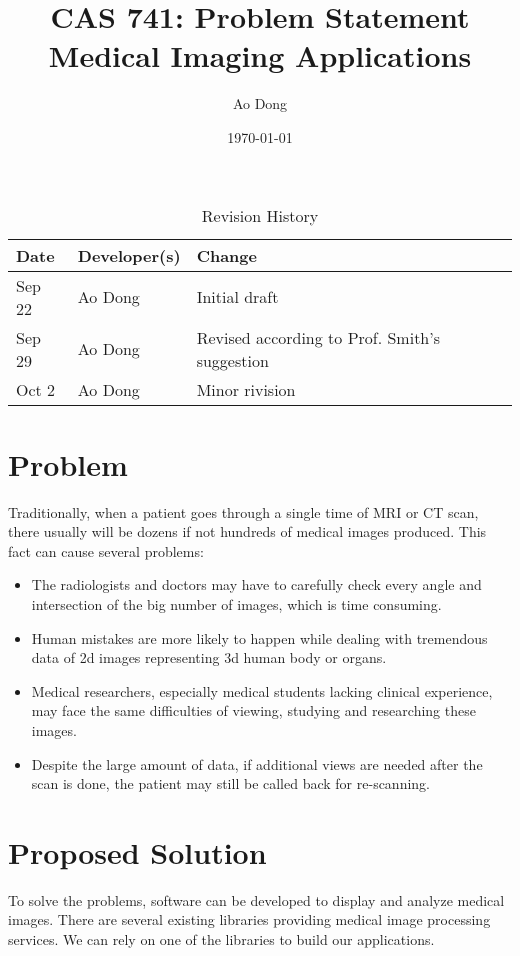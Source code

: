 \documentclass{article}
\title{CAS 741: Problem Statement\\Medical Imaging Applications}
\author{Ao Dong}
\date{\today}
\begin{document}
\maketitle

\begin{table}[hp]
\caption{Revision History} \label{TblRevisionHistory}
\begin{tabularx}{\textwidth}{llX}
\toprule
\textbf{Date} & \textbf{Developer(s)} & \textbf{Change}\\
\midrule
Sep 22 & Ao Dong & Initial draft\\
Sep 29 & Ao Dong & Revised according to Prof. Smith's suggestion\\
Oct 2 & Ao Dong & Minor rivision\\
\bottomrule
\end{tabularx}
\end{table}

\section*{Problem}
Traditionally, when a patient goes through a single time of MRI or CT scan, there usually will be dozens if not hundreds of medical images produced. This fact can cause several problems:

\begin{itemize}
\item The radiologists and doctors may have to carefully check every angle and intersection of the big number of images, which is time consuming.
\item Human mistakes are more likely to happen while dealing with tremendous data of 2d images representing 3d human body or organs.
\item Medical researchers, especially medical students lacking clinical experience, may face the same difficulties of viewing, studying and researching these images.
\item Despite the large amount of data, if additional views are needed after the scan is done, the patient may still be called back for re-scanning.
\end{itemize}

\section*{Proposed Solution}
To solve the problems, software can be developed to display and analyze medical images. There are several existing libraries providing medical image processing services. We can rely on one of the libraries to build our applications.
\end{document}
